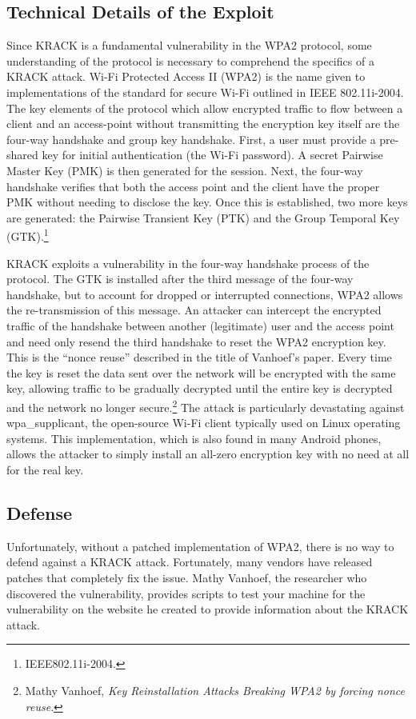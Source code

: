 \documentclass[12pt]{article}
\begin{document}
\begin{doublespace}
\section*{Technical Details of the Exploit}
Since KRACK is a fundamental vulnerability in the WPA2 protocol, some
understanding of the protocol is necessary to comprehend the specifics of
a KRACK attack. Wi-Fi Protected Access II (WPA2) is the name given to
implementations of the standard for secure Wi-Fi outlined in IEEE 802.11i-2004.
The key elements of the protocol which allow encrypted traffic to flow between
a client and an access-point without transmitting the encryption key itself
are the four-way handshake and group
key handshake. First, a user must provide a pre-shared key for initial
authentication (the Wi-Fi password). A secret Pairwise Master Key (PMK) is then
generated for the session. Next, the four-way handshake verifies that both the
access point and the client have the proper PMK without needing to disclose the
key. Once this is established, two more keys are generated: the Pairwise
Transient Key (PTK) and the Group Temporal Key (GTK).\footnote{IEEE802.11i-2004.}

KRACK exploits a vulnerability in the four-way handshake process of the
protocol. The GTK is installed after the third message of the four-way
handshake, but to account for dropped or interrupted connections, WPA2 allows
the re-transmission of this message.
An attacker can intercept the encrypted traffic of the handshake between
another (legitimate) user and the access point and
need only resend the third handshake to reset the WPA2 encryption key. This is
the ``nonce reuse'' described in the title of Vanhoef's paper. Every
time the key is reset the data sent over the network will be encrypted with
the same key, allowing traffic to be gradually decrypted until the entire
key is decrypted and the network no longer secure.\footnote{Mathy Vanhoef, \textit{Key Reinstallation Attacks Breaking WPA2 by forcing nonce reuse}.}
The attack is particularly devastating against wpa\_supplicant, the open-source
Wi-Fi client typically used on Linux operating systems. This implementation,
which is also found in many Android phones, allows the attacker to simply
install an all-zero encryption key with no need at all for the real key.\footnotemark[5]

\subsection*{Defense}
Unfortunately, without a patched implementation of WPA2, there is no way to
defend against a KRACK attack. Fortunately, many vendors have released patches
that completely fix the issue. Mathy Vanhoef, the researcher who discovered the
vulnerability, provides scripts to test your machine for the vulnerability on
the website he created to provide information about the KRACK attack.


\end{doublespace}
\end{document}
